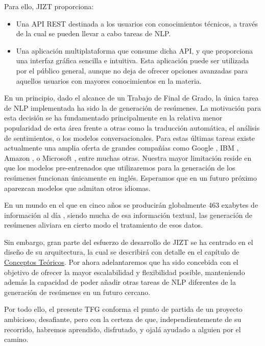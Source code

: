 Para ello, JIZT proporciona:

\vspace*{-0.3cm}

\begin{itemize}
	\item[\textbullet] Una API REST destinada a los usuarios con conocimientos técnicos, a través de la cual se pueden llevar a cabo tareas de NLP.
	\item[\textbullet] Una aplicación multiplataforma que consume dicha API, y que proporciona una interfaz gráfica sencilla e intuitiva. Esta aplicación puede ser utilizada por el público general, aunque no deja de ofrecer opciones avanzadas para aquellos usuarios con mayores conocimientos en la materia.
\end{itemize}

\vspace{-0.3cm}

En un principio, dado el alcance de un Trabajo de Final de Grado, la única tarea de NLP implementada ha sido la de generación de resúmenes. La motivación para esta decisión se ha fundamentado principalmente en la relativa menor popularidad de esta área frente a otras como la traducción automática, el análisis de sentimientos, o los modelos conversacionales. Para estas últimas tareas existe actualmente una amplia oferta de grandes compañías como Google \cite{cloudNL}, IBM \cite{watson}, Amazon \cite{comprehend}, o Microsoft \cite{textAnalytics}, entre muchas otras. Nuestra mayor limitación reside en que los modelos pre-entrenados que utilizaremos para la generación de los resúmenes funcionan únicamente en inglés. Esperamos que en un futuro próximo aparezcan modelos que admitan otros idiomas.

En un mundo en el que en cinco años se producirán globalmente 463 exabytes de información al día \cite{raconteur19}, siendo mucha de esa información textual, las generación de resúmenes aliviara en cierto modo el tratamiento de esos datos.

Sin embargo, gran parte del esfuerzo de desarrollo de JIZT se ha centrado en el diseño de su arquitectura, la cual se describirá con detalle en el capítulo de \hyperref[chapter:conceptos]{Conceptos Teóricos}. Por ahora adelantaremos que ha sido concebida con el objetivo de ofrecer la mayor escalabilidad y flexibilidad posible, manteniendo además la capacidad de poder añadir otras tareas de NLP diferentes de la generación de resúmenes en un futuro cercano.

Por todo ello, el presente TFG conforma el punto de partida de un proyecto ambicioso, desafiante, pero con la certeza de que, independientemente de su recorrido, habremos aprendido, disfrutado, y ojalá ayudado a alguien por el camino.